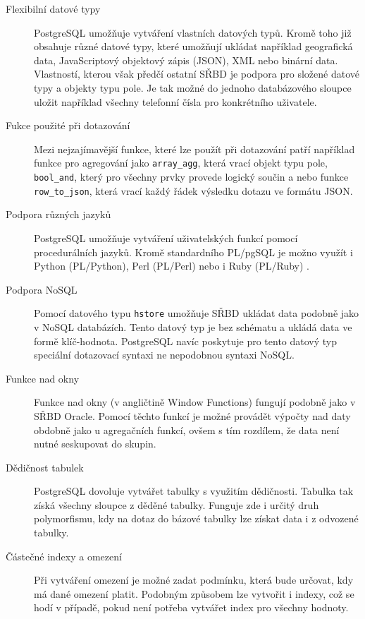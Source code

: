 \documentclass[ing,male,java,dept456]{diploma}						%
\begin{document}
\begin{description}
  \item[Flexibilní datové typy] PostgreSQL umožňuje vytváření vlastních datových typů. Kromě toho již obsahuje různé datové typy, které umožňují ukládat například geografická data, JavaScriptový objektový zápis (JSON), XML nebo binární data. Vlastností, kterou však předčí ostatní SŘBD je podpora pro složené datové typy a objekty typu pole. Je tak možné do jednoho databázového sloupce uložit například všechny telefonní čísla pro konkrétního uživatele.
  \item[Fukce použité při dotazování] Mezi nejzajímavější funkce, které lze použít při dotazování patří například funkce pro agregování jako \lstinline[style=inlinepython]|array_agg|, která vrací objekt typu pole, \lstinline[style=inlinepython]|bool_and|, který pro všechny prvky provede logický součin a nebo funkce \lstinline[style=inlinepython]|row_to_json|, která vrací každý řádek výsledku dotazu ve formátu JSON.
  \item[Podpora různých jazyků] PostgreSQL umožňuje vytváření uživatelských funkcí pomocí procedurálních jazyků. Kromě standardního PL/pgSQL je možno využít i Python (PL/Python), Perl (PL/Perl) nebo i Ruby (PL/Ruby) \cite{pllanguages}. 
  \item[Podpora NoSQL] Pomocí datového typu \lstinline[style=inlinepython]|hstore| umožňuje SŘBD ukládat data podobně jako v NoSQL databázích. Tento datový typ je bez schématu a ukládá data ve formě klíč-hodnota. PostgreSQL navíc poskytuje pro tento datový typ speciální dotazovací syntaxi ne nepodobnou syntaxi NoSQL.
  \item[Funkce nad okny] Funkce nad okny (v angličtině Window Functions) fungují podobně jako v SŘBD Oracle. Pomocí těchto funkcí je možné provádět výpočty nad daty obdobně jako u agregačních funkcí, ovšem s tím rozdílem, že data není nutné seskupovat do skupin.
  \item[Dědičnost tabulek] PostgreSQL dovoluje vytvářet tabulky s využitím dědičnosti. Tabulka tak získá všechny sloupce z děděné tabulky. Funguje zde i určitý druh polymorfismu, kdy na dotaz do bázové tabulky lze získat data i z odvozené tabulky.
  \item[Částečné indexy a omezení] Při vytváření omezení je možné zadat podmínku, která bude určovat, kdy má dané omezení platit. Podobným způsobem lze vytvořit i indexy, což se hodí v případě, pokud není potřeba vytvářet index pro všechny hodnoty.
\end{description}
\end{document}
